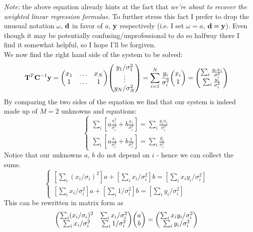 \documentclass[a4paper]{article}
\newcommand{\mat}[1]{\vb{#1}}
\newcommand{\quadre}[1]{\left[ {#1} \right]}
\begin{document}
\emph{Note:} the above equation already hints at the fact that \emph{we're about to recover the weighted linear regression formulae}. To further stress this fact I prefer to drop the unusual notation $\omega$, $\vb{d}$ in favor of $a$, $\vb{y}$ respectively (i.e. I set $\omega = a$, $\vb{d} = \vb{y}$). Even though it may be potentially confusing/unprofessional to do so halfway there I find it somewhat helpful, so I hope I'll be forgiven.\\
We now find the right hand side of the system to be solved:
\begin{equation*}
    \mat{T}^T\mat{C}^{-1}\vb{y} = \mqty(x_1 & \dots & x_N \\ 1 & \dots & 1)\mqty(y_1/\sigma_1^2 \\ \vdots \\ y_N/\sigma_N^2) = \sum_{i=1}^N \frac{y_i}{\sigma_i^2}\mqty(x_i \\ 1) = \mqty(\sum_i \frac{y_i x_i}{\sigma_i^2} \\ \sum_i \frac{y_i}{\sigma_i^2})
\end{equation*}
By comparing the two sides of the equation we find that our system is indeed made up of $M=2$ unknowns and equations:
\begin{equation*}
    \begin{cases}
        \sum_i \quadre{ a \frac{x_i^2}{\sigma_i^2} + b\frac{x_i}{\sigma_i^2}}= \sum_i \frac{y_i x_i}{\sigma_i^2}\\
        \sum_i \quadre{a \frac{x_i}{\sigma_i^2} + b \frac{1}{\sigma_i^2}} = \sum_i \frac{y_i}{\sigma_i^2}
    \end{cases}
\end{equation*}
Notice that our unknowns $a$, $b$ do not depend on $i$ - hence we can collect the sums.
\begin{equation*}
    \begin{cases}
        \quadre{\sum_i (x_i/\sigma_i)^2}a + \quadre{\sum_i x_i/\sigma_i^2}b = \quadre{\sum_i x_iy_i/\sigma_i^2}\\
        \quadre{\sum_i x_i/\sigma_i^2} a + \quadre{\sum_i 1/\sigma_i^2}b = \quadre{\sum_i y_i/\sigma_i^2}
    \end{cases}
\end{equation*}
This can be rewritten in matrix form as 
\begin{equation}
\label{eq:sistema_pesato}
    \mqty(\sum_i (x_i/\sigma_i)^2 & \sum_i x_i/\sigma_i^2 \\ \sum_i x_i/\sigma_i^2 & \sum_i 1/\sigma_i^2)\mqty(a \\ b) = \mqty(\sum_i x_iy_i/\sigma_i^2 \\ \sum_i y_i/\sigma_i^2)
\end{equation}
\end{document}
